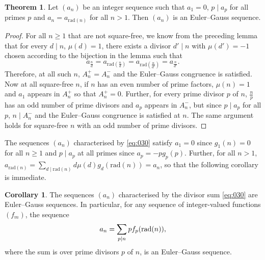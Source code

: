 \documentclass{article}
\numberwithin{equation}{section}
\theoremstyle{definition}
\newtheorem{corollary}[definition]{\bf {Corollary}}
\newtheorem{theorem}[definition]{\bf {Theorem}}
\begin{document}
\begin{theorem}
    Let $(a_n)$ be an integer sequence such that $a_1=0$, $p\mid a_p$ for all primes $p$ and $a_n=a_{\text{rad}(n)}$ for all $n>1$. Then $(a_n)$ is an Euler--Gauss sequence.
\end{theorem}
\begin{proof}
    For all $n\geq1$ that are not square-free, we know from the preceding lemma that for every $d\mid n$, $\mu(d)=1$, there exists a divisor $d'\mid n$ with $\mu(d')=-1$ chosen according to the bijection in the lemma such that
    \[a_\frac{n}{d}=a_{\text{rad}\left(\frac{n}{d}\right)}=a_{\text{rad}\left(\frac{n}{d'}\right)}=a_\frac{n}{d'}.\]
    Therefore, at all such $n$, $A_n^+=A_n^-$ and the Euler--Gauss congruence is satisfied. Now at all square-free $n$, if $n$ has an even number of prime factors, $\mu(n)=1$ and $a_1$ appears in $A_n^+$ so that $A_n^+=0$. Further, for every prime divisor $p$ of $n$, $\frac{n}{p}$ has an odd number of prime divisors and $a_p$ appears in $A_n^-$, but since $p\mid a_p$ for all $p$, $n\mid A_n^-$ and the Euler--Gauss congruence is satisfied at $n$. The same argument holds for square-free $n$ with an odd number of prime divisors.
\end{proof}
The sequences $(a_n)$ characterised by \eqref{eq:030} satisfy $a_1=0$ since $g_1(n)=0$ for all $n\geq1$ and $p\mid a_p$ at all primes since $a_p=-pg_p(p)$. Further, for all $n>1$, $a_{\text{rad}(n)}=\sum_{d\mid \text{rad}(n)}d\mu(d)g_d(\text{rad}(n))=a_n$, so that the following corollary is immediate.
\begin{corollary}
    The sequences $(a_n)$ characterised by the divisor sum \eqref{eq:030} are Euler--Gauss sequences. In particular, for any sequence of integer-valued functions $(f_m)$, the sequence
    \begin{equation}\label{eq:031}
    a_n=\sum_{p\mid n}pf_p(\textnormal{rad}(n)),
    \end{equation}
    where the sum is over prime divisors $p$ of $n$, is an Euler--Gauss sequence. 
\end{corollary}
\end{document}
